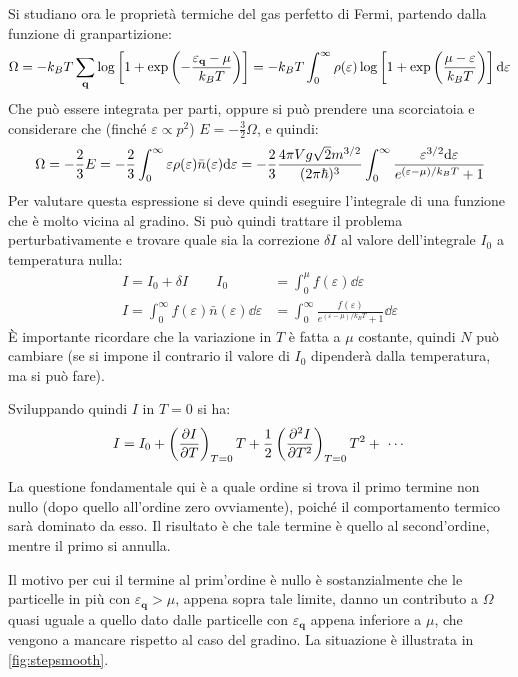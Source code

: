 Si studiano ora le proprietà termiche del gas perfetto di Fermi, partendo dalla funzione di granpartizione:
\begin{equation*}
\Omega = - k_B T \sum_{\textbf{q}} \log \left[1 + \exp \left(-\frac{\varepsilon_{\textbf{q}} - \mu}{k_B T}\right)\right] = - k_B T \int_{0}^{\infty} \rho(\varepsilon)\log \left[1 + \exp \left(\frac{\mu - \varepsilon}{k_B T}\right)\right] \dd \varepsilon
\end{equation*}
Che può essere integrata per parti, oppure si può prendere una scorciatoia e considerare che (finché $\varepsilon \propto p^2$) $E = -\frac{3}{2} \Omega$, e quindi:
\begin{equation*}
\Omega =  -\frac{2}{3} E = -\frac{2}{3} \int_{0}^{\infty} \varepsilon \rho(\varepsilon)\bar{n}(\varepsilon)\dd \varepsilon = - \frac{2}{3} \frac{4\pi V g \sqrt{2} m^{3/2}}{(2\pi \hbar)^3} \int_{0}^{\infty}\frac{\varepsilon^{3/2} \dd \varepsilon}{e^{(\varepsilon - \mu)/k_BT} +1}
\end{equation*}
Per valutare questa espressione si deve quindi eseguire l'integrale di una funzione che è molto vicina al gradino.
Si può quindi trattare il problema perturbativamente e trovare quale sia la correzione $\delta I$ al valore dell'integrale $I_0$ a temperatura nulla:
\begin{align*}
I = I_0 + \delta I \qquad I_0 &= \int_{0}^{\mu} f(\varepsilon) \dd \varepsilon\\
I= \int_{0}^{\infty} f(\varepsilon) \bar{n}(\varepsilon) \dd \varepsilon &= \int_{0}^{\infty}  \frac{f(\varepsilon)}{e^{(\varepsilon - \mu)/k_BT} +1} \dd \varepsilon
\end{align*}
\`E importante ricordare che la variazione in $T$ è fatta a $\mu$ costante, quindi $N$ può cambiare (se si impone il contrario il valore di $I_0$ dipenderà dalla temperatura, ma si può fare).

Sviluppando quindi $I$ in $T=0$ si ha:
\begin{equation*}
I = I_0 + \left(\frac{\partial {I}}{\partial {T}}\right)_{T=0} T + \frac{1}{2} \left(\frac{\partial {^2 I}}{\partial {T^2}}\right)_{T=0} T^2 + ~\cdots
\end{equation*}

La questione fondamentale qui è a quale ordine si trova il primo termine non nullo (dopo quello all'ordine zero ovviamente), poiché il comportamento termico sarà dominato da esso. Il risultato è che tale termine è quello al second'ordine, mentre il primo si annulla.

Il motivo per cui il termine al prim'ordine è nullo è sostanzialmente che le particelle in più con $\varepsilon_{\textbf{q}} > \mu$, appena sopra tale limite, danno un contributo a $\Omega$ quasi uguale a quello dato dalle particelle con $\varepsilon_{\textbf{q}}$ appena inferiore a $\mu$, che vengono a mancare rispetto al caso del gradino. La situazione è illustrata in \cref{fig:stepsmooth}.

